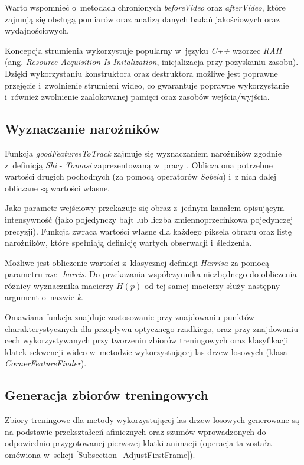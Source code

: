   Warto wspomnieć o~metodach chronionych \textit{beforeVideo} oraz \textit{afterVideo}, które zajmują się obsługą pomiarów oraz analizą danych badań jakościowych oraz wydajnościowych.

  Koncepcja strumienia wykorzystuje popularny w~języku \textit{C++} wzorzec \textit{RAII} (ang. \textit{Resource Acquisition Is Initalization}, inicjalizacja przy pozyskaniu zasobu). Dzięki wykorzystaniu konstruktora oraz destruktora możliwe jest poprawne przejęcie i~zwolnienie strumieni wideo, co gwarantuje poprawne wykorzystanie i~również zwolnienie zaalokowanej pamięci oraz zasobów wejścia/wyjścia.

  \subsection{Wyznaczanie narożników}
  Funkcja \textit{goodFeaturesToTrack} zajmuje się wyznaczaniem narożników zgodnie z~definicją \textit{Shi} - \textit{Tomasi} zaprezentowaną w~pracy \cite{GoodFeaturesToTrack94}. Oblicza ona potrzebne wartości drugich pochodnych (za pomocą operatorów \textit{Sobela}) i~z nich dalej obliczane są wartości własne.

  Jako parametr wejściowy przekazuje się obraz z~jednym kanałem opisującym intensywność (jako pojedynczy bajt lub liczba zmiennoprzecinkowa pojedynczej precyzji). Funkcja zwraca wartości własne dla każdego piksela obrazu oraz listę narożników, które spełniają definicję wartych obserwacji i~śledzenia.

  Możliwe jest obliczenie wartości z~klasycznej definicji \textit{Harrisa} za pomocą parametru \textit{use\_harris}. Do przekazania współczynnika niezbędnego do obliczenia różnicy wyznacznika macierzy $H(p)$ od tej samej macierzy służy następny argument o~nazwie \textit{k}.

  Omawiana funkcja znajduje zastosowanie przy znajdowaniu punktów charakterystycznych dla przepływu optycznego rzadkiego, oraz przy znajdowaniu cech wykorzystywanych przy tworzeniu zbiorów treningowych oraz klasyfikacji klatek sekwencji wideo w~metodzie wykorzystującej las drzew losowych (klasa \textit{CornerFeatureFinder}).

  \subsection{Generacja zbiorów treningowych}
  Zbiory treningowe dla metody wykorzystującej las drzew losowych generowane są na podstawie przekształceń afinicznych oraz szumów wprowadzonych do odpowiednio przygotowanej pierwszej klatki animacji (operacja ta została omówiona w~sekcji \ref{Subsection_AdjustFirstFrame}).

